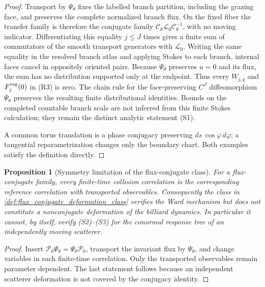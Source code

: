 \documentclass[11pt]{amsart}
\theoremstyle{compactplain}
\newtheorem{proposition}[theorem]{Proposition}
\theoremstyle{compactdefinition}
\theoremstyle{compactremark}
\newcommand{\Ltransfer}{\mathscr L}
\newcommand{\Pcal}{\mathcal P}
\begin{document}
\begin{proof}
Transport by \(\Psi_\theta\) fixes the labelled branch partition, including
the grazing face, and preserves the complete normalized branch flux.  On the
fixed fiber the transfer family is therefore the conjugate family
\(\mathcal C_\theta\Ltransfer_0\mathcal C_\theta^{-1}\), with no moving
indicator.  Differentiating this equality \(j\le J\) times gives a finite sum
of commutators of the smooth transport generators with \(\Ltransfer_0\).
Writing the same equality in the resolved branch atlas and applying Stokes to
each branch, internal faces cancel in oppositely oriented pairs.  Because
\(\Psi_\theta\) preserves \(u=0\) and its flux, the sum has no distribution
supported only at the endpoint.  Thus every \(W_{j,q}\) and
\(F_j^{\rm reg}(0)\) in (R3) is zero.  The chain rule for the face-preserving
\(C^J\) diffeomorphism \(\Psi_\theta\) preserves the resulting finite
distributional identities.  Bounds on the completed countable branch scale are
not inferred from this finite Stokes calculation; they remain the distinct
analytic statement (S1).

A common torus translation is a phase
conjugacy preserving \(ds\,\cos\varphi\,d\varphi\); a tangential
reparametrization changes only the boundary chart.  Both examples satisfy the
definition directly.
\end{proof}

\begin{proposition}[Symmetry limitation of the flux-conjugate class]
\label{prop:flux_conjugate_symmetry_limitation}
For a flux-conjugate family, every finite-time collision correlation is the
corresponding reference correlation with transported observables.  Consequently
the class in \cref{def:flux_conjugate_deformation_class} verifies the Ward
mechanism but does not constitute a nonconjugate deformation of the billiard
dynamics.  In particular it cannot, by itself, verify (S2)--(S3) for the
conormal response tree of an independently moving scatterer.
\end{proposition}

\begin{proof}
Insert \(\Pcal_\theta\Psi_\theta=\Psi_\theta\Pcal_0\), transport the invariant
flux by \(\Psi_\theta\), and change variables in each finite-time correlation.
Only the transported observables remain parameter dependent.  The last
statement follows because an independent scatterer deformation is not covered
by the conjugacy identity.
\end{proof}
\end{document}
